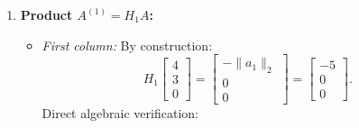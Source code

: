 \begin{example}
\begin{enumerate}
\begin{equation}
    \end{equation}
    Expanding the dyadic product:
    \begin{equation}
        \frac{2}{90} v_1 v_1^T = \frac{1}{45} \begin{bmatrix} 81 & 27 & 0 \\ 27 & 9 & 0 \\ 0 & 0 & 0 \end{bmatrix} = \begin{bmatrix} 9/5 & 3/5 & 0 \\ 3/5 & 1/5 & 0 \\ 0 & 0 & 0 \end{bmatrix}.
    \end{equation}
    Subtracting from $I_3$:
    \begin{equation}
        H_1 = \begin{bmatrix} 1 & 0 & 0 \\ 0 & 1 & 0 \\ 0 & 0 & 1 \end{bmatrix} - \begin{bmatrix} 9/5 & 3/5 & 0 \\ 3/5 & 1/5 & 0 \\ 0 & 0 & 0 \end{bmatrix} = \begin{bmatrix} -4/5 & -3/5 & 0 \\ -3/5 & 4/5 & 0 \\ 0 & 0 & 1 \end{bmatrix}.
    \end{equation}
    \item \textbf{Product $A^{(1)} = H_1 A$:}
    \begin{itemize}
        \item \textit{First column:} By construction:
        \begin{equation}
            H_1 \begin{bmatrix} 4 \\ 3 \\ 0 \end{bmatrix} = \begin{bmatrix} -\|a_1\|_2 \\ 0 \\ 0 \end{bmatrix} = \begin{bmatrix} -5 \\ 0 \\ 0 \end{bmatrix}.
        \end{equation}
        Direct algebraic verification:

\end{itemize}
\end{enumerate}
\end{example}
